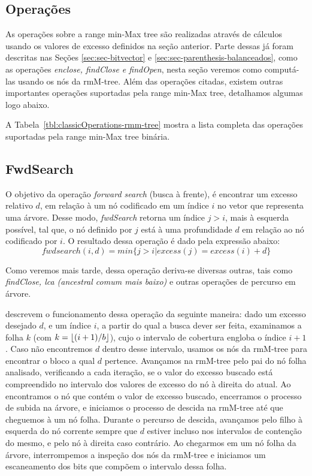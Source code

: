 \subsection{Operações}
As operações sobre a range min-Max tree são realizadas através de cálculos usando os valores de excesso definidos na seção anterior.  Parte dessas já foram descritas nas Seções \ref{sec:sec-bitvector} e \ref{sec:sec-parenthesis-balanceados}, como as operações  \textit{enclose, findClose  e  findOpen}, nesta seção veremos como computá-las usando os nós da rmM-tree.
Além das operações citadas, existem outras importantes operações suportadas pela range min-Max tree, detalhamos algumas logo abaixo. 

A Tabela~\ref{tbl:classicOperations-rmm-tree} mostra a lista completa das operações suportadas pela range min-Max tree binária.

\subsection{FwdSearch}\label{sec:fwdsearch-bin}
    O objetivo da operação \textit{forward search} (busca à frente), é encontrar um excesso relativo $d$, em relação à um nó codificado em um índice $i$ no vetor que representa uma árvore. Desse modo, \textit{ fwdSearch} retorna um índice $j>i$, mais à esquerda possível, tal que, o nó definido por $j$ está à uma profundidade $d$ em relação ao nó codificado por $i$. O resultado dessa operação é dado pela expressão abaixo:
    $$fwdsearch(i,d) = min\{j > i | excess(j) = excess(i) + d\}$$
    
    Como veremos mais tarde, dessa operação deriva-se diversas outras, tais como \textit{findClose, lca (ancestral comum mais baixo)} e outras operações de percurso em árvore.

    \citet{paper-simple-and-efficient-fully-functional-succinct-trees} descrevem o funcionamento dessa operação da seguinte maneira: dado um excesso desejado $d$, e um índice $i$, a partir do qual a busca dever ser feita, examinamos a folha $k$ (com $k= \lfloor(i+1)/b\rfloor$), cujo o intervalo de cobertura engloba o índice $i+1$.
    Caso não encontremos $d$ dentro desse intervalo, usamos os nós da rmM-tree para encontrar o bloco a qual $d$ pertence. Avançamos na rmM-tree pelo pai do nó folha analisado, verificando a cada iteração, se o valor do excesso buscado está compreendido no intervalo dos valores de excesso do nó à direita do atual. Ao encontramos o nó que contém o valor de excesso buscado, encerramos o processo de subida na árvore, e iniciamos o processo de descida na rmM-tree até que cheguemos à um nó folha. Durante o percurso de descida, avançamos pelo filho à esquerda do nó corrente sempre que $d$ estiver incluso nos intervalos de contenção do mesmo, e pelo nó à direita caso contrário. Ao chegarmos em um nó folha da árvore, interrompemos a inspeção dos nós da rmM-tree e iniciamos um escaneamento dos bits que compõem o intervalo dessa folha.

